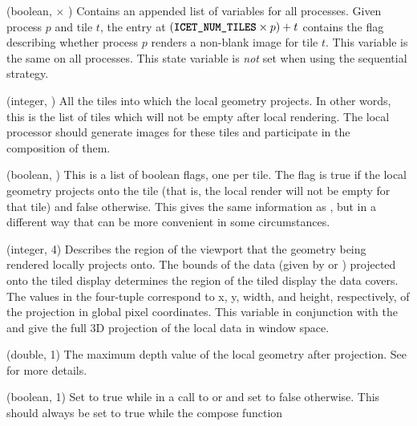 \begin{Description}[xxxxxxxx]
\item[\CEnum{ICET\_ALL\_CONTAINED\_TILES\_MASKS}] (boolean,
   $\times$ ) Contains
  an appended list of  variables for
  all processes.  Given process $p$ and tile $t$, the entry at
  $(\CEnum{ICET\_NUM\_TILES} \times p)+t$ contains the flag describing
  whether process $p$ renders a non-blank image for tile $t$.  This
  variable is the same on all processes.  This state variable is \emph{not}
  set when using the sequential strategy.
\item[\CEnum{ICET\_CONTAINED\_TILES\_LIST}] (integer,
  ) All the tiles into which the local
  geometry projects.  In other words, this is the list of tiles which will
  not be empty after local rendering.  The local processor should generate
  images for these tiles and participate in the composition of them.
\item[\CEnum{ICET\_CONTAINED\_TILES\_MASK}] (boolean,
  ) This is a list of boolean flags, one per tile.
  The flag is true if the local geometry projects onto the tile (that is,
  the local render will not be empty for that tile) and false otherwise.
  This gives the same information as ,
  but in a different way that can be more convenient in some circumstances.
\item[\CEnum{ICET\_CONTAINED\_VIEWPORT}] (integer, 4) Describes the region
  of the viewport that the geometry being rendered locally projects onto.
  The bounds of the data (given by  or
  ) projected onto the tiled display determines
  the region of the tiled display the data covers.  The values in the
  four-tuple correspond to x, y, width, and height, respectively, of the
  projection in global pixel coordinates.  This variable in conjunction
  with the  and  give the
  full 3D projection of the local data in window space.
\item[\CEnum{ICET\_FAR\_DEPTH}] (double, 1) The maximum depth value of the
  local geometry after projection.  See 
  for more details.
\item[\CEnum{ICET\_IS\_DRAWING\_FRAME}] (boolean, 1) Set to true while in a
  call to  or  and set to false
  otherwise.  This should always be set to true while the compose function

\end{Description}
